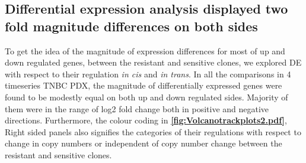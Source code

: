 \subsection{Differential expression analysis displayed two fold  magnitude differences on both sides}
To get the idea of the magnitude of expression differences for most of up and down regulated genes, between the resistant and sensitive clones, we explored \ac{DE} with respect to their regulation \textit{in cis} and \textit{in trans}. In all the comparisons in 4 timeseries TNBC PDX, the magnitude of differentially expressed genes were found to be modestly equal on both up and down regulated sides. Majority of them were in the range of log2 fold change both in positive and negative directions. Furthermore, the colour coding in \textbf{\autoref{fig:Volcanotrackplots2.pdf}}, Right sided panels also signifies the categories of their regulations with respect to change in copy numbers or independent of copy number change between the resistant and sensitive clones.


